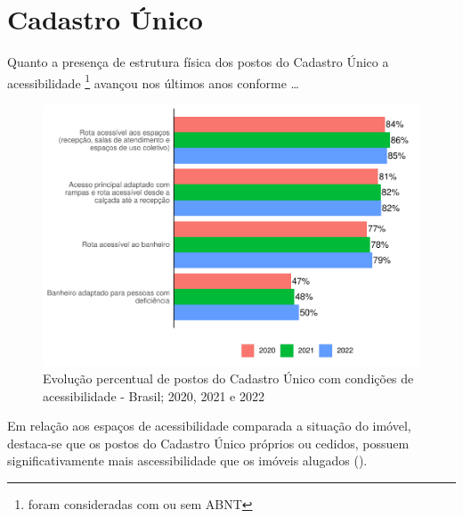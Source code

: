 \documentclass[
  brazilian]{report}
\begin{document}
\hypertarget{cadastro-uxfanico}{%
\section{Cadastro Único}\label{cadastro-uxfanico}}

Quanto a presença de estrutura física dos postos do Cadastro Único a
acessibilidade \footnote{foram consideradas com ou sem ABNT} avançou nos
últimos anos conforme \ldots{}

\begin{figure}
\includegraphics{Censo-SUAS-2022_files/figure-latex/postcad-acessibilidade-1} \caption[Evolução percentual de postos do Cadastro Único com condições de acessibilidade - Brasil]{Evolução percentual de postos do Cadastro Único com condições de acessibilidade - Brasil; 2020, 2021 e 2022}\label{fig:postcad-acessibilidade}
\end{figure}

Em relação aos espaços de acessibilidade comparada a situação do imóvel,
destaca-se que os postos do Cadastro Único próprios ou cedidos, possuem
significativamente mais ascessibilidade que os imóveis alugados
().
\end{document}
